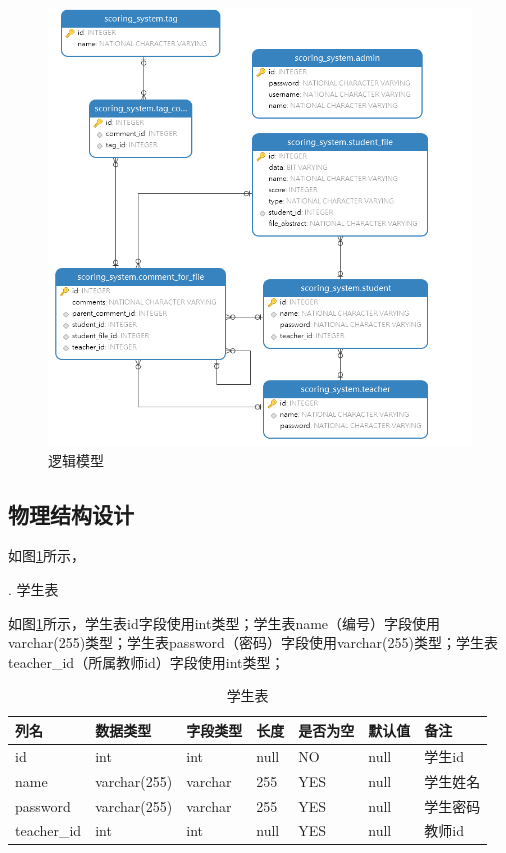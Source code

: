 \begin{figure}[htbp]
    \centering
    \includegraphics[scale = 0.6]{out/uml/数据库/logical-model.png}
    \caption{\song\wuhao 逻辑模型}
    \label{logical-model}
\end{figure}

\subsection{物理结构设计}

如图\ref{logical-model}所示，

.  学生表

如图\ref{db-student}所示，学生表id字段使用int类型；学生表name（编号）字段使用varchar(255)类型；学生表password（密码）字段使用varchar(255)类型；学生表teacher\_id（所属教师id）字段使用int类型；
\begin{table}[]
    \centering
    \song\wuhao
    \caption{学生表}
    \label{db-student}
    \begin{tabular}{lllllll}
        \hline
        列名        & 数据类型     & 字段类型 & 长度 & 是否为空 & 默认值 & 备注     \\ \hline
        id          & int          & int      & null & NO       & null   & 学生id   \\
        name        & varchar(255) & varchar  & 255  & YES      & null   & 学生姓名 \\
        password    & varchar(255) & varchar  & 255  & YES      & null   & 学生密码 \\
        teacher\_id & int          & int      & null & YES      & null   & 教师id   \\ \hline
    \end{tabular}
\end{table}

